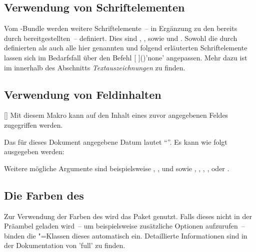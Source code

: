 \begin{Declaration*}{}
\begin{Declaration*}{}
\begin{Declaration*}{}
\subsection{Verwendung von Schriftelementen}
%
%
%
Vom \TUDScript-Bundle werden weitere Schriftelemente~-- in Ergänzung zu den 
bereits durch \KOMAScript{} bereitgestellten~-- definiert. Dies sind 
, ,  sowie 
und . Sowohl die durch \KOMAScript{} definierten als auch 
alle hier genannten und folgend erläuterten Schriftelemente lassen sich im 
Bedarfsfall über den Befehl [%
]()'none' angepassen. Mehr dazu ist im \scrguide innerhalb 
des Abschnitts \emph{Textauszeichnungen} zu finden.



\subsection{Verwendung von Feldinhalten}
%
\begin{Declaration}[v2.06]{[]}
\printdeclarationlist
Mit diesem Makro kann auf den Inhalt eines zuvor angegebenen Feldes zugegriffen 
werden.
\begin{Example}
Das für dieses Dokument angegebene Datum lautet \enquote{}. Es 
kann wie folgt ausgegeben werden:
\begin{Code}
\end{Code}
\end{Example}
Weitere mögliche Argumente sind beispielsweise , 
,  und  sowie ,
, , ,  oder
.
\end{Declaration}

\subsection{Die Farben des \CDs}
%
%
Zur Verwendung der Farben des \CDs wird das Paket  
genutzt. Falls dieses nicht in der Präambel geladen wird~-- um beispielsweise 
zusätzliche Optionen aufzurufen~-- binden die \TUDScript"=Klassen dieses 
automatisch ein. Detaillierte Informationen sind in der Dokumentation von 
'full' zu finden.
%




\end{Declaration*}
\end{Declaration*}
\end{Declaration*}
